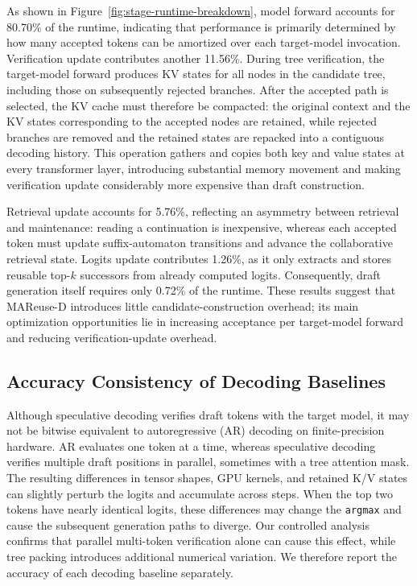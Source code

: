 \documentclass[letterpaper]{article} %
\begin{document}
As shown in Figure~\ref{fig:stage-runtime-breakdown}, model forward accounts for 80.70\% of the runtime, indicating that performance is primarily determined by how many accepted tokens can be amortized over each target-model invocation. Verification update contributes another 11.56\%. During tree verification, the target-model forward produces KV states for all nodes in the candidate tree, including those on subsequently rejected branches. After the accepted path is selected, the KV cache must therefore be compacted: the original context and the KV states corresponding to the accepted nodes are retained, while rejected branches are removed and the retained states are repacked into a contiguous decoding history. This operation gathers and copies both key and value states at every transformer layer, introducing substantial memory movement and making verification update considerably more expensive than draft construction.

Retrieval update accounts for 5.76\%, reflecting an asymmetry between retrieval and maintenance: reading a continuation is inexpensive, whereas each accepted token must update suffix-automaton transitions and advance the collaborative retrieval state. Logits update contributes 1.26\%, as it only extracts and stores reusable top-$k$ successors from already computed logits. Consequently, draft generation itself requires only 0.72\% of the runtime. These results suggest that MAReuse-D introduces little candidate-construction overhead; its main optimization opportunities lie in increasing acceptance per target-model forward and reducing verification-update overhead.
\subsection{Accuracy Consistency of Decoding Baselines}

Although speculative decoding verifies draft tokens with the target model, it
may not be bitwise equivalent to autoregressive (AR) decoding on
finite-precision hardware. AR evaluates one token at a time, whereas
speculative decoding verifies multiple draft positions in parallel, sometimes
with a tree attention mask. The resulting differences in tensor shapes, GPU
kernels, and retained K/V states can slightly perturb the logits and accumulate
across steps. When the top two tokens have nearly identical logits, these
differences may change the \texttt{argmax} and cause the subsequent generation
paths to diverge. Our controlled analysis confirms that parallel
multi-token verification alone can cause this effect, while tree packing
introduces additional numerical variation. We therefore report the accuracy of
each decoding baseline separately.
\end{document}

